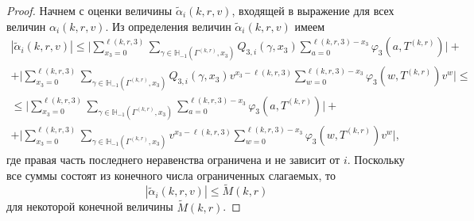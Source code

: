\begin{proof}
Начнем с оценки величины $\tilde{\alpha}_i(k, r, v)$,  входящей в выражение для всех величин $\alpha_i(k, r, v)$. Из определения величин $\tilde{\alpha}_i(k, r, v)$ имеем 
\begin{multline*}
|\tilde{\alpha}_i(k, r, v) | 
\leqslant
\biggl| \sum_{x_3=0}^{\ell(k, r, 3)}\sum_{\gamma \in {\mathbb H}_{-1}(\Gamma^{(k, r)}, x_3)} Q_{3, i}(\gamma, x_3) \sum_{a=0}^{\ell(k, r, 3) - x_3} \varphi_3(a, T^{(k, r)}) \biggr| +  \\
+ \biggl| \sum_{x_3=0}^{\ell(k, r, 3)}  \sum_{\gamma \in {\mathbb H}_{-1}(\Gamma^{(k, r)}, x_3)} Q_{3, i}(\gamma, x_3) v^{x_3-\ell(k, r, 3)}  \sum_{w=0}^{\ell(k, r, 3) -x_3}
\varphi_3(w, T^{(k, r)}) v^w\biggr| \leqslant\\
\leqslant
\biggl| \sum_{x_3=0}^{\ell(k, r, 3)}\sum_{\gamma \in {\mathbb H}_{-1}(\Gamma^{(k, r)}, x_3)}  \sum_{a=0}^{\ell(k, r, 3) - x_3} \varphi_3(a, T^{(k, r)}) \biggr| +  \\
+ \biggl| \sum_{x_3=0}^{\ell(k, r, 3)}  \sum_{\gamma \in {\mathbb H}_{-1}(\Gamma^{(k, r)}, x_3)}  v^{x_3-\ell(k, r, 3)}  \sum_{w=0}^{\ell(k, r, 3) -x_3}
\varphi_3(w, T^{(k, r)}) v^w\biggr|, 
\end{multline*}
где правая часть последнего неравенства ограничена и не зависит от $i$.
Поскольку все суммы состоят из конечного числа ограниченных слагаемых,  то
\begin{equation*}
|\tilde{\alpha}_i(k, r, v) | \leqslant \tilde{M}(k, r)
\end{equation*}
для некоторой конечной величины $\tilde{M}(k, r)$.


\end{proof}
